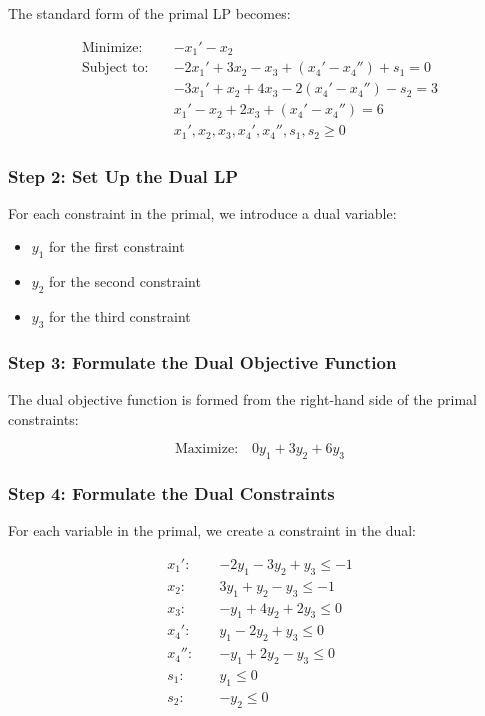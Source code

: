 \documentclass[12pt,letterpaper]{article}
\begin{document}
The standard form of the primal LP becomes:

\begin{align*}
\text{Minimize:} \quad & -x_1' - x_2 \\
\text{Subject to:} \quad
& -2x_1' + 3x_2 - x_3 + (x_4' - x_4'') + s_1 = 0 \\
& -3x_1' + x_2 + 4x_3 - 2(x_4' - x_4'') - s_2 = 3 \\
& x_1' - x_2 + 2x_3 + (x_4' - x_4'') = 6 \\
& x_1', x_2, x_3, x_4', x_4'', s_1, s_2 \geq 0
\end{align*}

\subsubsection{Step 2: Set Up the Dual LP}

For each constraint in the primal, we introduce a dual variable:
\begin{itemize}
    \item $y_1$ for the first constraint
    \item $y_2$ for the second constraint
    \item $y_3$ for the third constraint
\end{itemize}

\subsubsection{Step 3: Formulate the Dual Objective Function}

The dual objective function is formed from the right-hand side of the primal constraints:

\begin{equation*}
\text{Maximize:} \quad 0y_1 + 3y_2 + 6y_3
\end{equation*}

\subsubsection{Step 4: Formulate the Dual Constraints}

For each variable in the primal, we create a constraint in the dual:

\begin{align*}
x_1': \quad & -2y_1 - 3y_2 + y_3 \leq -1 \\
x_2: \quad & 3y_1 + y_2 - y_3 \leq -1 \\
x_3: \quad & -y_1 + 4y_2 + 2y_3 \leq 0 \\
x_4': \quad & y_1 - 2y_2 + y_3 \leq 0 \\
x_4'': \quad & -y_1 + 2y_2 - y_3 \leq 0 \\
s_1: \quad & y_1 \leq 0 \\
s_2: \quad & -y_2 \leq 0
\end{align*}
\end{document}
